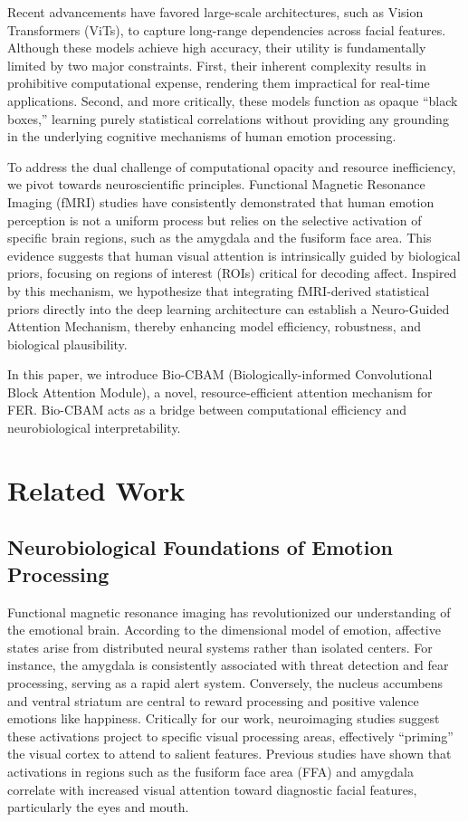 \documentclass[twocolumn, sn-mathphys, Numbered]{sn-jnl}
\begin{document}
Recent advancements have favored large-scale architectures, such as Vision Transformers (ViTs), to capture long-range dependencies across facial features. Although these models achieve high accuracy, their utility is fundamentally limited by two major constraints. First, their inherent complexity results in prohibitive computational expense, rendering them impractical for real-time applications. Second, and more critically, these models function as opaque “black boxes,” learning purely statistical correlations without providing any grounding in the underlying cognitive mechanisms of human emotion processing.

To address the dual challenge of computational opacity and resource inefficiency, we pivot towards neuroscientific principles. Functional Magnetic Resonance Imaging (fMRI) studies have consistently demonstrated that human emotion perception is not a uniform process but relies on the selective activation of specific brain regions, such as the amygdala and the fusiform face area. This evidence suggests that human visual attention is intrinsically guided by biological priors, focusing on regions of interest (ROIs) critical for decoding affect. Inspired by this mechanism, we hypothesize that integrating fMRI-derived statistical priors directly into the deep learning architecture can establish a Neuro-Guided Attention Mechanism, thereby enhancing model efficiency, robustness, and biological plausibility.

In this paper, we introduce Bio-CBAM (Biologically-informed Convolutional Block Attention Module), a novel, resource-efficient attention mechanism for FER. Bio-CBAM acts as a bridge between computational efficiency and neurobiological interpretability.

\section{Related Work}\label{sec2}

\subsection{Neurobiological Foundations of Emotion Processing}
Functional magnetic resonance imaging has revolutionized our understanding of the emotional brain. According to the dimensional model of emotion, affective states arise from distributed neural systems rather than isolated centers. For instance, the amygdala is consistently associated with threat detection and fear processing, serving as a rapid alert system. Conversely, the nucleus accumbens and ventral striatum are central to reward processing and positive valence emotions like happiness. Critically for our work, neuroimaging studies suggest these activations project to specific visual processing areas, effectively “priming” the visual cortex to attend to salient features. Previous studies have shown that activations in regions such as the fusiform face area (FFA) and amygdala correlate with increased visual attention toward diagnostic facial features, particularly the eyes and mouth.
\end{document}
